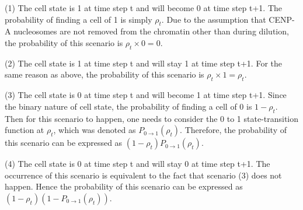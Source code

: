 (1) The cell state is 1 at time step t and will become 0 at time step t+1. The probability of finding a cell of 1 is simply $\rho_{t}$. Due to the assumption that CENP-A nucleosomes are not removed from the chromatin other than during dilution, the probability of this scenario is $\rho_{t} \times 0 = 0$. 

(2) The cell state is 1 at time step t and will stay 1 at time step t+1. For the same reason as above, the probability of this scenario is $\rho_{t} \times 1 = \rho_{t}$. 

(3) The cell state is 0 at time step t and will become 1 at time step t+1. Since the binary nature of cell state, the probability of finding a cell of 0 is $1 - \rho_{t}$. Then for this scenario to happen, one needs to consider the 0 to 1 state-transition function at $\rho_{t}$, which was denoted as $P_{0\rightarrow 1}(\rho_{t})$. Therefore, the probability of this scenario can be expressed as $(1 - \rho_{t})P_{0\rightarrow 1}(\rho_{t})$. 

(4) The cell state is 0 at time step t and will stay 0 at time step t+1. The occurrence of this scenario is equivalent to 
the fact that scenario (3) does not happen. Hence the probability of this scenario can be expressed as $(1 - \rho_{t})(1 - P_{0\rightarrow 1}(\rho_{t}))$.

